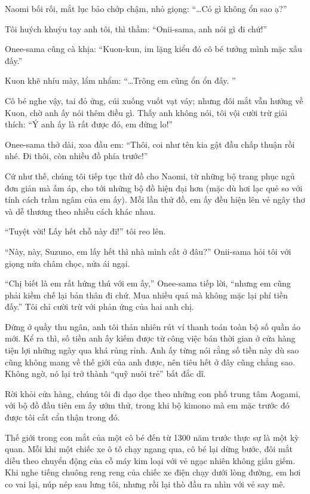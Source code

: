 \documentclass[../main.tex]{subfiles}
\begin{document}
Naomi bối rối, mắt lục bảo chớp chậm, nhỏ giọng: ``\dots Có gì không ổn sao ạ?''

Tôi huých khuỷu tay anh tôi, thì thầm: ``Onii-sama, anh nói gì đi chứ!''

Onee-sama cũng cà khịa: ``Kuon-kun, im lặng kiểu đó cô bé tưởng mình mặc xấu đấy.''

Kuon khẽ nhíu mày, lẩm nhẩm: ``\dots Trông em cũng ổn ổn đấy. ''

Cô bé nghe vậy, tai đỏ ửng, cúi xuống vuốt vạt váy; nhưng đôi mắt vẫn hướng về Kuon, chờ anh ấy nói thêm điều gì. Thấy anh không nói, tôi vội cười trừ giải thích: ``Ý anh ấy là rất được đó, em đừng lo!''

Onee-sama thở dài, xoa đầu em: ``Thôi, coi như tên kia gật đầu chấp thuận rồi nhé. Đi thôi, còn nhiều đồ phía trước!''

Cứ như thế, chúng tôi tiếp tục thử đồ cho Naomi, từ những bộ trang phục ngủ đơn giản mà ấm áp, cho tới những bộ đồ hiện đại hơn (mặc dù hơi lạc quẻ so với tính cách trầm ngâm của em ấy). Mỗi lần thử đồ, em ấy đều hiện lên vẻ ngây thơ và dễ thương theo nhiều cách khác nhau.

``Tuyệt vời! Lấy hết chỗ này đi!'' tôi reo lên.

``Này, này, Suzuno, em lấy hết thì nhà mình cất ở đâu?'' Onii-sama hỏi tôi với giọng nửa châm chọc, nửa ái ngại.

``Chị biết là em rất hứng thú với em ấy,'' Onee-sama tiếp lời, ``nhưng em cũng phải kiềm chế lại bản thân đi chứ. Mua nhiều quá mà không mặc lại phí tiền đấy.'' Tôi chỉ cười trừ với phản ứng của hai anh chị.

Đứng ở quầy thu ngân, anh tôi thản nhiên rút ví thanh toán toàn bộ số quần áo mới. Kể ra thì, số tiền anh ấy kiếm được từ công việc bán thời gian ở cửa hàng tiện lợi những ngày qua khá rủng rỉnh. Anh ấy từng nói rằng số tiền này dù sao cũng không mang về thế giới của anh được, nên tiêu hết ở đây cũng chẳng sao. Không ngờ, nó lại trở thành ``quỹ nuôi trẻ'' bất đắc dĩ.

Rời khỏi cửa hàng, chúng tôi đi dạo dọc theo những con phố trung tâm Aogami, với bộ đồ đầu tiên em ấy ướm thử, trong khi bộ kimono mà em mặc trước đó được tôi cất cẩn thận trong đó.

Thế giới trong con mắt của một cô bé đến từ 1300 năm trước thực sự là một kỳ quan. Mỗi khi một chiếc xe ô tô chạy ngang qua, cô bé lại dừng bước, đôi mắt diễu theo chuyển động của cỗ máy kim loại với vẻ ngạc nhiên không giấu giếm. Khi nghe tiếng chuông reng reng của chiếc xe điện chạy dưới lòng đường, em hơi co vai lại, núp nép sau lưng tôi, nhưng rồi lại thò đầu ra nhìn với vẻ say mê.
\end{document}
